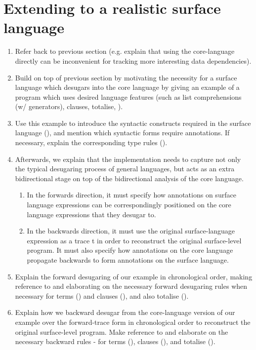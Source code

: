 \section{Extending to a realistic surface language}
\label{sec:surface-language}

\begin{enumerate}
   \item Refer back to previous section (e.g. explain that using the core-language directly can be inconvenient for tracking more interesting data dependencies).
   \item Build on top of previous section by motivating the necessity for a surface language which desugars into the core language by giving an example of a program which uses desired language features (such as list comprehensions (w/ generators), clauses, totalise, ).
   \item Use this example to introduce the syntactic constructs required in the surface language (), and mention which syntactic forms require annotations. If necessary, explain the corresponding type rules ().
   \item Afterwards, we explain that the implementation needs to capture not only the typical desugaring process of general languages, but acts as an extra bidirectional stage on top of the bidirectional analysis of the core language.
   \begin{enumerate}
      \item In the forwards direction, it must specify how annotations on surface language expressions can be correspondingly positioned on the core language expressions that they desugar to.
      \item In the backwards direction, it must use the original surface-language expression as a trace t in order to reconstruct the original surface-level program. It must also specify how annotations on the core language propagate backwards to form annotations on the surface language.
   \end{enumerate}
   \item Explain the forward desugaring of our example in chronological order, making reference to and elaborating on the necessary forward desugaring rules when necessary for terms () and clauses (), and also totalise ().
   \item Explain how we backward desugar from the core-language version of our example over the forward-trace form in chronological order to reconstruct the original surface-level program. Make reference to and elaborate on the necessary backward rules - for terms (), clauses (), and totalise ().
\end{enumerate}

